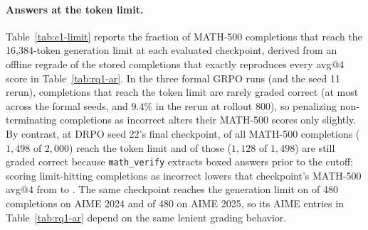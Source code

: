 \documentclass[10pt]{article}
\begin{document}
\begin{table}[H]
\caption{E1 internal validation and validation-selected checkpoints. Validation accuracy is the share of 960 sampled answers graded correct on the 60 AIME 2024/2025 problems; per-problem results are not exported, so no sampling error is given. The selected checkpoint is the saved checkpoint with the highest validation accuracy, and its MATH-500 score is the avg@4 of Table~\ref{tab:rq1-ar}. $^{\dagger}$Mean of two independent evaluations.}
\label{tab:e1-validation}
\centering
\small

\end{table}

\paragraph{Answers at the token limit.}
Table~\ref{tab:e1-limit} reports the fraction of MATH-500 completions that reach the 16,384-token generation limit at each evaluated checkpoint, derived from an offline regrade of the stored completions that exactly reproduces every avg@4 score in Table~\ref{tab:rq1-ar}.
In the three formal GRPO runs (and the seed 11 rerun), completions that reach the token limit are rarely graded correct (at most \EOneLimitCorrectGRPOMax{} across the formal seeds, and $9.4\%$ in the rerun at rollout 800), so penalizing non-terminating completions as incorrect alters their MATH-500 scores only slightly.
By contrast, at DRPO seed 22's final checkpoint, \EOneLimitDRPOTwentyTwo{} of all MATH-500 completions ($1{,}498$ of $2{,}000$) reach the token limit and \EOneLimitCorrectDRPOTwentyTwo{} of those ($1{,}128$ of $1{,}498$) are still graded correct because \texttt{math\_verify} extracts boxed answers prior to the cutoff; scoring limit-hitting completions as incorrect lowers that checkpoint's MATH-500 avg@4 from \EOneMathDRPOEndTwentyTwo{} to \EOneStrictDRPOTwentyTwo{}.
The same checkpoint reaches the generation limit on \EOneLimitAimeDRPOTwentyTwoFirst{} of 480 completions on AIME 2024 and \EOneLimitAimeDRPOTwentyTwoSecond{} of 480 on AIME 2025, so its AIME entries in Table~\ref{tab:rq1-ar} depend on the same lenient grading behavior.

\begin{table}[H]
\caption{E1 answers at the token limit on MATH-500. An answer is at the limit when its stored text, tokenized again, has at least 97\% of the 16,384-token generation limit. Columns 200 to 800 give the share of a checkpoint's answers at the limit. For the final checkpoint the table gives how many answers at the limit are graded correct, the share of the other answers graded correct, and avg@4 with every answer at the limit counted wrong. Seed 11's final checkpoints pool their two evaluations.}
\label{tab:e1-limit}
\centering
\footnotesize

\end{table}
\end{document}
